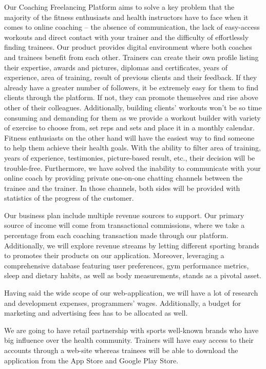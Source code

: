 \documentclass[12pt]{report}
\begin{document}
Our Coaching Freelancing Platform aims to solve a key problem that the majority of the fitness enthusiasts and health instructors have to face when it comes to online coaching – the absence of communication, the lack of easy-access workouts and direct contact with your trainer and the difficulty of effortlessly finding trainees. Our product provides digital environment where both coaches and trainees benefit from each other. Trainers can create their own profile listing their expertise, awards and pictures, diplomas and certificates, years of experience, area of training, result of previous clients and their feedback. If they already have a greater number of followers, it be extremely easy for them to find clients through the platform. If not, they can promote themselves and rise above other of their colleagues. Additionally, building clients’ workouts won’t be so time consuming and demanding for them as we provide a workout builder with variety of exercise to choose from, set reps and sets and place it in a monthly calendar. Fitness enthusiasts on the other hand will have the easiest way to find someone to help them achieve their health goals. With the ability to filter area of training, years of experience, testimonies, picture-based result, etc., their decision will be trouble-free. Furthermore, we have solved the inability to communicate with your online coach by providing private one-on-one chatting channels between the trainee and the trainer. In those channels, both sides will be provided with statistics of the progress of the customer.

Our business plan include multiple revenue sources to support. Our primary source of income will come from transactional commissions, where we take a percentage from each coaching transaction made through our platform. Additionally, we will explore revenue streams by letting different sporting brands to promotes their products on our application. Moreover, leveraging a comprehensive database featuring user preferences, gym performance metrics, sleep and dietary habits, as well as body measurements, stands as a pivotal asset.

Having said the wide scope of our web-application, we will have a lot of research and development expenses, programmers’ wages. Additionally, a budget for marketing and advertising fees has to be allocated as well. 

We are going to have retail partnership with sports well-known brands who have big influence over the health community. Trainers will have easy access to their accounts through a web-site whereas trainees will be able to download the application from the App Store and Google Play Store. 
\end{document}

